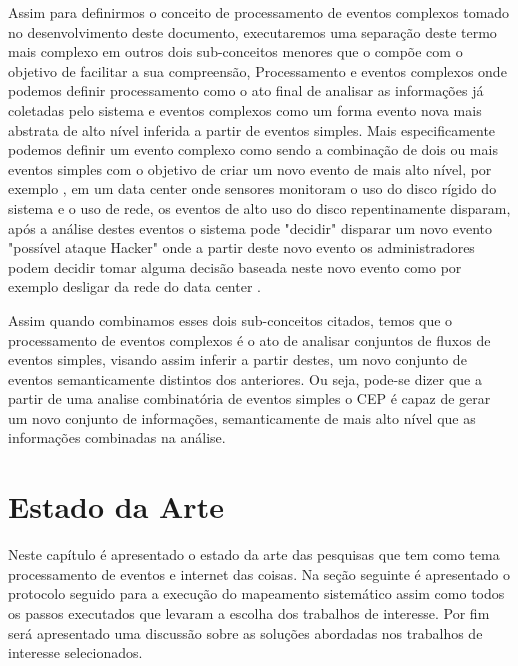 \documentclass[tid,table]{texufpel} %
\begin{document}
Assim para definirmos o conceito de processamento de eventos complexos tomado no desenvolvimento deste documento, executaremos uma separação  deste termo mais complexo em outros dois sub-conceitos menores que o compõe com o objetivo de facilitar a sua compreensão, Processamento e eventos complexos onde podemos definir processamento como o ato final de analisar as informações já coletadas pelo sistema e eventos complexos como um forma evento nova mais abstrata de alto nível inferida a partir de eventos simples. Mais especificamente podemos definir um evento complexo como sendo a combinação de dois ou mais eventos simples com o objetivo de criar um novo evento de mais alto nível, por exemplo \cite{dayarathna2018recent}, em um data center onde sensores monitoram o uso do disco rígido do sistema e o uso de rede, os eventos de alto uso do disco repentinamente disparam, após a análise destes eventos o sistema pode "decidir" disparar um novo evento "possível ataque Hacker" onde a partir deste novo evento os administradores podem decidir tomar alguma decisão  baseada neste novo evento como por exemplo desligar da rede do data center \cite{wu2006high}. 

Assim quando combinamos esses dois sub-conceitos citados, temos que o processamento de eventos complexos é o ato de analisar conjuntos de fluxos de eventos simples, visando assim inferir a partir destes, um novo conjunto de eventos semanticamente distintos dos anteriores. Ou seja, pode-se dizer que a partir de uma analise combinatória de eventos simples o CEP é capaz de gerar um novo conjunto de informações, semanticamente de mais alto nível que as informações combinadas na análise.




\chapter{Estado da Arte} 
\label{cap:Estado_da_Arte}

Neste capítulo é apresentado o estado da arte das pesquisas que tem como tema processamento de eventos e internet das coisas. Na seção seguinte é apresentado o protocolo seguido para a execução do mapeamento sistemático assim como todos os passos executados que levaram a escolha dos trabalhos de interesse. Por fim será apresentado uma discussão sobre as soluções abordadas nos trabalhos de interesse selecionados.    
\end{document}
